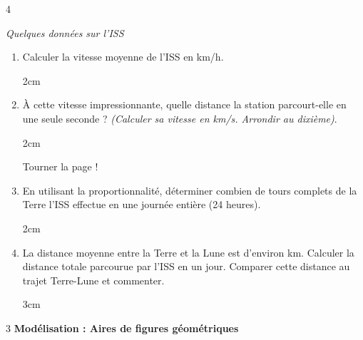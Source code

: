 \documentclass[a4paper]{book}
\begin{document}
{\begin{exerciceNote}{4}
\begin{minipage}{0.4\textwidth}
\begin{center}
                \textit{\small Quelques données sur l'ISS}
            \end{center}
        \end{minipage}
    
        \smallskip
        \begin{enumerate}
            \item Calculer la vitesse moyenne de l'ISS en km/h.
            \begin{ZoneReponse}{2cm}
            \end{ZoneReponse}
            
            \item À cette vitesse impressionnante, quelle distance la station parcourt-elle en une seule seconde ? \textit{(Calculer sa vitesse en km/s. Arrondir au dixième)}.
            \begin{ZoneReponse}{2cm}
            \end{ZoneReponse}

\vfill  \hfill Tourner la page !

\newpage

            
            \item En utilisant la proportionnalité, déterminer combien de tours complets de la Terre l'ISS effectue en une journée entière (24 heures).
            \begin{ZoneReponse}{2cm}
            \end{ZoneReponse}

            \item La distance moyenne entre la Terre et la Lune est d'environ  km. Calculer la distance totale parcourue par l'ISS en un jour. Comparer cette distance au trajet Terre-Lune et commenter.
            \begin{ZoneReponse}{3cm}
            \end{ZoneReponse}
        \end{enumerate}
    \end{exerciceNote}

    \begin{exerciceNote}{3}
        \textbf{Modélisation : Aires de figures géométriques} 
        

\end{exerciceNote}}
\end{document}
